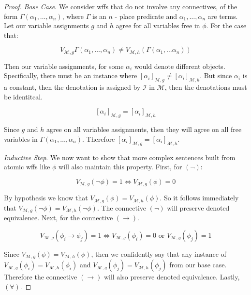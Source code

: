 \documentclass{article}
\begin{document}
    \begin{proof}
        \textit{Base Case}. We consider wffs that do not involve any connectives, of the form $\Gamma(\alpha_1, \dots , \alpha_n)$, where $\Gamma$ is an $n$ - place predicate and $\alpha_1, \dots, \alpha_n$ are terms.
        Let our variable assignments $g$ and $h$ agree for all variables free in $\phi$. For the case that:
        
        $$V_{\mathscr{M}, g}\Gamma(\alpha_1, \dots , \alpha_n) \neq V_{\mathscr{M}, h}(\Gamma(\alpha_1, \dots \alpha_n))$$

        Then our variable assignments, for some $\alpha_i$ would denote different objects. Specifically, there must be an instance where $[\alpha_i]_{\mathscr{M}, g} \neq [\alpha_i]_{\mathscr{M}, h}$.
        But since $\alpha_i$ is a constant, then the denotation is assigned by $\mathscr{I}$ in $\mathscr{M}$, then the denotations must be identitcal.

        $$[\alpha_i]_{\mathscr{M},g} = [\alpha_i]_{\mathscr{M}, h}$$

        Since $g$ and $h$ agree on all variablee assignments, then they will agree on all free variables in $\Gamma(\alpha_1, \dots, \alpha_n)$. Therefore $[\alpha_i]_{\mathscr{M}, g} = [\alpha_i]_{\mathscr{M}, h}$.

        \noindent \textit{Inductive Step}. We now want to show that more complex sentences built from atomic wffs like $\phi$ will also maintain this property.
        First, for $(\lnot)$:

        $$V_{\mathscr{M}, g}(\lnot\phi) = 1 \iff V_{\mathscr{M},g}(\phi) = 0$$

        By hypothesis we know that $V_{\mathscr{M}, g}(\phi) = V_{\mathscr{M}, h}(\phi)$. So it follows immediately that $V_{\mathscr{M}, g}(\lnot \phi) = V_{\mathscr{M}, h}(\lnot \phi)$.
        The connective $(\lnot)$ will preserve denoted equivalence.
        Next, for the connective $(\rightarrow)$. 

        $$V_{\mathscr{M}, g}(\phi_i \rightarrow \phi_j) = 1 \iff V_{\mathscr{M}, g}(\phi_i) = 0 \text{ or } V_{\mathscr{M}, g}(\phi_j) = 1$$

        Since $V_{\mathscr{M},g}(\phi) = V_{\mathscr{M}, h}(\phi)$, then we confidently say that any instance of $V_{\mathscr{M}, g}(\phi_i) = V_{\mathscr{M}, h}(\phi_i)$ and $V_{\mathscr{M}, g}(\phi_j) = V_{\mathscr{M},h}(\phi_j)$
        from our base case. Therefore the connective $(\rightarrow)$ will also preserve denoted equivalence.
        Lastly, $(\forall)$.


\end{proof}
\end{document}
